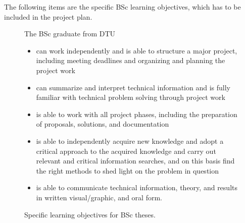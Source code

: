 \documentclass{article}
\begin{document}
The following items are the specific BSc learning objectives, which has to be included in the project plan.
\begin{figure}
    \caption{Specific learning objectives for BSc theses.}
    \begin{tcolorbox}[colframe=white]
    The BSc graduate from DTU
    \begin{itemize}
        \item can work independently and is able to structure a major project, including meeting deadlines and organizing and planning the project work
        \item can summarize and interpret technical information and is fully familiar with technical problem solving through project work
        \item is able to work with all project phases, including the preparation of proposals, solutions, and documentation
        \item is able to independently acquire new knowledge and adopt a critical approach to the acquired knowledge and carry out relevant and critical information searches, and on this basis find the right methods to shed light on the problem in question
        \item is able to communicate technical information, theory, and results in written visual/graphic, and oral form.
    \end{itemize}
    \end{tcolorbox}
\end{figure}
\end{document}
